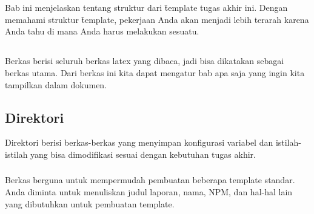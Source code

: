 \chapter{\babEmpat}
\label{bab:4}
Bab ini menjelaskan tentang struktur dari \f{template} tugas akhir ini.
Dengan memahami struktur \f{template}, pekerjaan Anda akan menjadi lebih terarah karena Anda tahu di mana Anda harus melakukan sesuatu.



\section{}
\label{sec:thesis-tex}
Berkas  berisi seluruh berkas \gls{latex} yang dibaca, jadi bisa dikatakan sebagai berkas utama.
Dari berkas ini kita dapat mengatur bab apa saja yang ingin kita tampilkan dalam dokumen.


\section{Direktori }
\label{sec:config-dir}
Direktori  berisi berkas-berkas yang menyimpan konfigurasi variabel dan istilah-istilah yang bisa dimodifikasi sesuai dengan kebutuhan tugas akhir.

\subsection{}
\label{sec:settings-tex}
Berkas  berguna untuk mempermudah pembuatan beberapa template standar.
Anda diminta untuk menuliskan judul laporan, nama, NPM, dan hal-hal lain yang dibutuhkan untuk pembuatan template.

